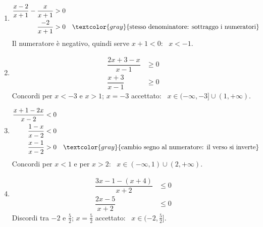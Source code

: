 \begin{question}[ID=2.2, subtitle={Disequazioni frazionarie}, difficulty=media, tags={disequazioni frazionarie}]
\begin{explanation}
\begin{enumerate}
\[\begin{aligned}
    \dfrac{x+3}{x-3} &\leq 0
    \end{aligned}\]
    $N\geq0$ per $x\geq-3$, $D>0$ per $x>3$: sono discordi tra $-3$ e $3$; $x=-3$ annulla la frazione ed è accettato. \ $x\in[-3,3)$.
    \item \[\begin{aligned}
    \dfrac{x-2}{x+1}-\dfrac{x}{x+1} &> 0\\
    \dfrac{-2}{x+1} &> 0 && \textcolor{gray}{\text{stesso denominatore: sottraggo i numeratori}}
    \end{aligned}\]
    Il numeratore è negativo, quindi serve $x+1<0$: \ $x<-1$.
    \item \[\begin{aligned}
    \dfrac{2x+3-x}{x-1} &\geq 0\\
    \dfrac{x+3}{x-1} &\geq 0
    \end{aligned}\]
    Concordi per $x<-3$ e $x>1$; $x=-3$ accettato: \ $x\in(-\infty,-3]\cup(1,+\infty)$.
    \item \[\begin{aligned}
    \dfrac{x+1-2x}{x-2} &< 0\\
    \dfrac{1-x}{x-2} &< 0\\
    \dfrac{x-1}{x-2} &> 0 && \textcolor{gray}{\text{cambio segno al numeratore: il verso si inverte}}
    \end{aligned}\]
    Concordi per $x<1$ e per $x>2$: \ $x\in(-\infty,1)\cup(2,+\infty)$.
    \item \[\begin{aligned}
    \dfrac{3x-1-(x+4)}{x+2} &\leq 0\\
    \dfrac{2x-5}{x+2} &\leq 0
    \end{aligned}\]
    Discordi tra $-2$ e $\tfrac52$; $x=\tfrac52$ accettato: \ $x\in(-2,\tfrac52]$.
\end{enumerate}
\end{explanation}
\end{question}



